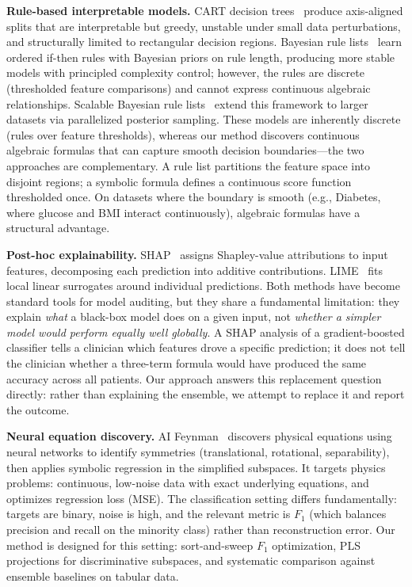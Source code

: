 \documentclass[journal]{IEEEtran}
\begin{document}
\textbf{Rule-based interpretable models.}
CART decision trees~\cite{breiman1984cart} produce axis-aligned
splits that are interpretable but greedy, unstable under small data
perturbations, and structurally limited to rectangular decision
regions.  Bayesian rule lists~\cite{letham2015interpretable} learn
ordered if-then rules with Bayesian priors on rule length, producing
more stable models with principled complexity control; however, the
rules are discrete (thresholded feature comparisons) and cannot
express continuous algebraic relationships.  Scalable Bayesian rule
lists~\cite{yang2017scalable} extend this framework to larger
datasets via parallelized posterior sampling.  These models are
inherently discrete (rules over feature thresholds), whereas our
method discovers continuous algebraic formulas that can capture
smooth decision boundaries---the two approaches are complementary.
A rule list partitions the feature space into disjoint regions; a
symbolic formula defines a continuous score function thresholded
once.  On datasets where the boundary is smooth (e.g., Diabetes,
where glucose and BMI interact continuously), algebraic formulas have
a structural advantage.

\textbf{Post-hoc explainability.}
SHAP~\cite{lundberg2017unified} assigns Shapley-value attributions
to input features, decomposing each prediction into additive
contributions.  LIME~\cite{ribeiro2016should} fits local linear
surrogates around individual predictions.  Both methods have become
standard tools for model auditing, but they share a fundamental
limitation: they explain \emph{what} a black-box model does on a
given input, not \emph{whether a simpler model would perform equally
well globally}.  A SHAP analysis of a gradient-boosted classifier
tells a clinician which features drove a specific prediction; it does
not tell the clinician whether a three-term formula would have
produced the same accuracy across all patients.  Our approach answers
this replacement question directly: rather than explaining the
ensemble, we attempt to replace it and report the outcome.

\textbf{Neural equation discovery.}
AI Feynman~\cite{udrescu2020ai} discovers physical equations using
neural networks to identify symmetries (translational, rotational,
separability), then applies symbolic regression in the simplified
subspaces.  It targets physics problems: continuous, low-noise data
with exact underlying equations, and optimizes regression loss
(MSE).  The classification setting differs fundamentally: targets are
binary, noise is high, and the relevant metric is $F_1$ (which
balances precision and recall on the minority class) rather than
reconstruction error.  Our method is designed for this setting:
sort-and-sweep $F_1$ optimization, PLS projections for
discriminative subspaces, and systematic comparison against ensemble
baselines on tabular data.
\end{document}
